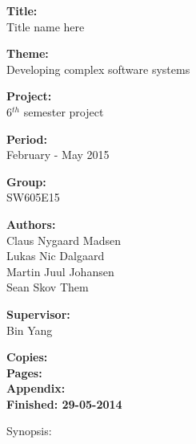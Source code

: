 \begin{minipage}[t]{0.48\textwidth}
\textbf{Title:} \\[5pt]\bigskip\hspace{2ex}
Title name here

\textbf{Theme:} \\[5pt]\bigskip\hspace{2ex}
Developing complex software systems

\textbf{Project:} \\[5pt]\bigskip\hspace{2ex}
6$^{th}$ semester project

\textbf{Period:} \\[5pt]\bigskip\hspace{2ex}
February - May 2015

\textbf{Group:} \\[5pt]\bigskip\hspace{2ex}
SW605E15	

\textbf{Authors:} \\[5pt]\hspace*{2ex}
Claus Nygaard Madsen\\\hspace*{2ex}
Lukas Nic Dalgaard \\\hspace*{2ex}
Martin Juul Johansen \\\hspace*{2ex}
Sean Skov Them \\\hspace*{2ex}

\textbf{Supervisor:} \\[5pt]\hspace*{2ex}
Bin Yang \\\bigskip\hspace{2ex}

\textbf{Copies: } \\
\textbf{Pages: } \\
\textbf{Appendix: } \\ 
\textbf{Finished: 29-05-2014}

\end{minipage}
\hfill
\begin{minipage}[t]{0.5\textwidth}
\vspace{1cm}
Synopsis: \\[5pt]
\fbox{\parbox{7cm}{\bigskip\bigskip}} %
\end{minipage}

\vfill

